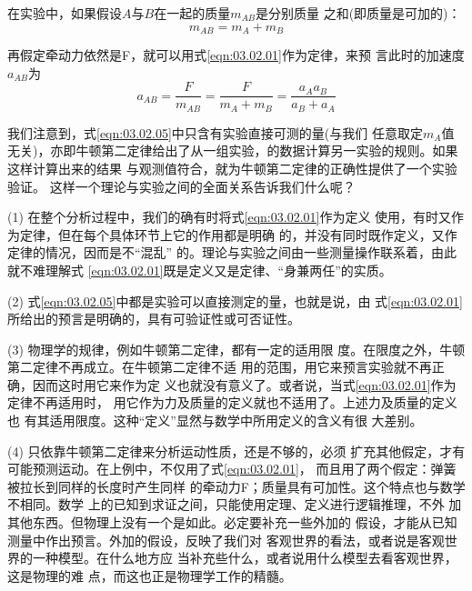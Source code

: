 在实验中，如果假设$ A $与$ B $在一起的质量$ m_{AB} $是分别质量
之和(即质量是可加的)：
\begin{equation}\label{eqn:03.02.04}
  m _ { A B } = m _ { A } + m _ { B }
\end{equation}

再假定牵动力依然是F，就可以用式\eqref{eqn:03.02.01}作为定律，来预
言此时的加速度$ a_{AB} $为
\begin{equation}\label{eqn:03.02.05}
  a _ { A B } = \frac { F } { m _ { A B } } = \frac { F } { m _ { A } + m _ { B } } = \frac { a _ { A } a _ { B } } { a _ { B } + a _ { A } }
\end{equation}

{我们注意到，式\eqref{eqn:03.02.05}中只含有实验直接可测的量(与我们
任意取定$ m_A $值无关)，亦即牛顿第二定律给出了从一组实验\lhbrak {}，\rhbrak 的数据计算另一实验\lhbrak {}\rhbrak 的规则。如果这样计算出来的结果
与观测值符合，就为牛顿第二定律的正确性提供了一个实验验证。
这样一个理论与实验之间的全面关系告诉我们什么呢？}

(1) 在整个分析过程中，我们的确有时将式\eqref{eqn:03.02.01}作为定义
使用，有时又作为定律，但在每个具体环节上它的作用都是明确
的，并没有同时既作定义，又作定律的情况，因而是不“混乱”
的。理论与实验之间由一些测量操作联系着，由此就不难理解式
\eqref{eqn:03.02.01}既是定义又是定律、“身兼两任”的实质。

(2) 式\eqref{eqn:03.02.05}中都是实验可以直接测定的量，也就是说，由
式\eqref{eqn:03.02.01}所给出的预言是明确的，具有可验证性或可否证性。

(3) 物理学的规律，例如牛顿第二定律，都有一定的适用限
度。在限度之外，牛顿第二定律不再成立。在牛顿第二定律不适
用的范围，用它来预言实验就不再正确，因而这时用它来作为定
义也就没有意义了。或者说，当式\eqref{eqn:03.02.01}作为定律不再适用时，
用它作为力及质量的定义就也不适用了。上述力及质量的定义也
有其适用限度。这种“定义”显然与数学中所用定义的含义有很
大差别。

(4) 只依靠牛顿第二定律来分析运动性质，还是不够的，必须
扩充其他假定，才有可能预测运动。在上例中，不仅用了式\eqref{eqn:03.02.01}，
而且用了两个假定：弹簧被拉长到同样的长度时产生同样
的牵动力F；质量具有可加性。这个特点也与数学不相同。数学
上的已知到求证之间，只能使用定理、定义进行逻辑推理，不外
加其他东西。但物理上没有一个是如此。必定要补充一些外加的
假设，才能从已知测量中作出预言。外加的假设，反映了我们对
客观世界的看法，或者说是客观世界的一种模型。在什么地方应
当补充些什么，或者说用什么模型去看客观世界，这是物理的难
点，而这也正是物理学工作的精髓。

